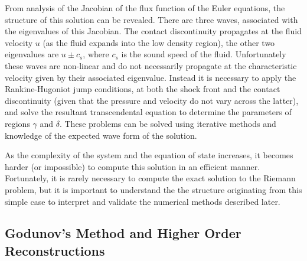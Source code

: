 From analysis of the Jacobian of the flux function of the Euler equations, the structure of this solution can be revealed.
There are three waves, associated with the eigenvalues of this Jacobian.
The contact discontinuity propagates at the fluid velocity $u$ (as the fluid expands into the low density region), the other two eigenvalues are $u\pm c_s$, where $c_s$ is the sound speed of the fluid.
Unfortunately these waves are non-linear and do not necessarily propagate at the characteristic velocity given by their associated eigenvalue.
Instead it is necessary to apply the Rankine-Hugoniot jump conditions, at both the shock front and the contact discontinuity (given that the pressure and velocity do not vary across the latter), and solve the resultant transcendental equation to determine the parameters of regions $\gamma$ and $\delta$.
These problems can be solved using iterative methods and knowledge of the expected wave form of the solution.

As the complexity of the system and the equation of state increases, it becomes harder (or impossible) to compute this solution in an efficient manner.
Fortunately, it is rarely necessary to compute the exact solution to the Riemann problem, but it is important to understand the the structure originating from this simple case to interpret and validate the numerical methods described later.


\subsection{Godunov's Method and Higher Order Reconstructions}

